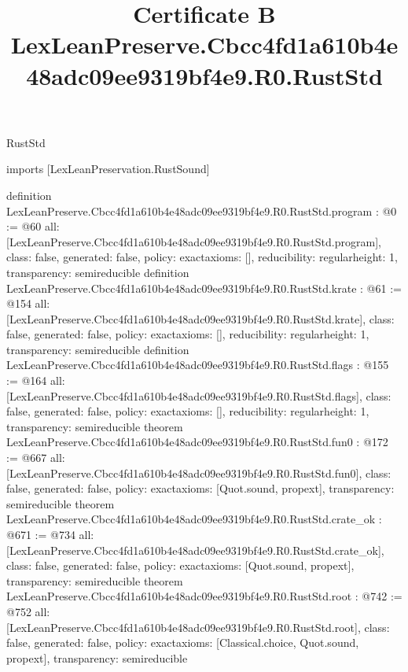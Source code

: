 \begin{lexlean}{RustStd}
\title{Certificate B LexLeanPreserve.Cbcc4fd1a610b4e48adc09ee9319bf4e9.R0.RustStd}
\begin{coremodule}
imports [LexLeanPreservation.RustSound]

definition LexLeanPreserve.Cbcc4fd1a610b4e48adc09ee9319bf4e9.R0.RustStd.program : @0 := @60 {
  all: [LexLeanPreserve.Cbcc4fd1a610b4e48adc09ee9319bf4e9.R0.RustStd.program],
  class: false,
  generated: false,
  policy: exact{axioms: []},
  reducibility: regular{height: 1},
  transparency: semireducible
}
definition LexLeanPreserve.Cbcc4fd1a610b4e48adc09ee9319bf4e9.R0.RustStd.krate : @61 := @154 {
  all: [LexLeanPreserve.Cbcc4fd1a610b4e48adc09ee9319bf4e9.R0.RustStd.krate],
  class: false,
  generated: false,
  policy: exact{axioms: []},
  reducibility: regular{height: 1},
  transparency: semireducible
}
definition LexLeanPreserve.Cbcc4fd1a610b4e48adc09ee9319bf4e9.R0.RustStd.flags : @155 := @164 {
  all: [LexLeanPreserve.Cbcc4fd1a610b4e48adc09ee9319bf4e9.R0.RustStd.flags],
  class: false,
  generated: false,
  policy: exact{axioms: []},
  reducibility: regular{height: 1},
  transparency: semireducible
}
theorem LexLeanPreserve.Cbcc4fd1a610b4e48adc09ee9319bf4e9.R0.RustStd.fun0 : @172 := @667 {
  all: [LexLeanPreserve.Cbcc4fd1a610b4e48adc09ee9319bf4e9.R0.RustStd.fun0],
  class: false,
  generated: false,
  policy: exact{axioms: [Quot.sound, propext]},
  transparency: semireducible
}
theorem LexLeanPreserve.Cbcc4fd1a610b4e48adc09ee9319bf4e9.R0.RustStd.crate_ok : @671 := @734 {
  all: [LexLeanPreserve.Cbcc4fd1a610b4e48adc09ee9319bf4e9.R0.RustStd.crate_ok],
  class: false,
  generated: false,
  policy: exact{axioms: [Quot.sound, propext]},
  transparency: semireducible
}
theorem LexLeanPreserve.Cbcc4fd1a610b4e48adc09ee9319bf4e9.R0.RustStd.root : @742 := @752 {
  all: [LexLeanPreserve.Cbcc4fd1a610b4e48adc09ee9319bf4e9.R0.RustStd.root],
  class: false,
  generated: false,
  policy: exact{axioms: [Classical.choice, Quot.sound, propext]},
  transparency: semireducible
}


\end{coremodule}
\end{lexlean}
